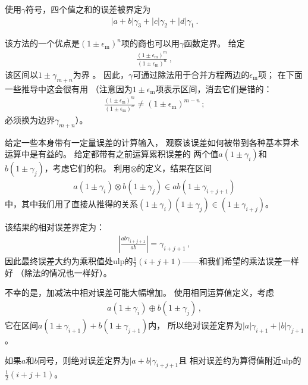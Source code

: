 使用$\gamma$符号，四个值之和的误差被界定为
\begin{align*}
    |a+b|\gamma_3+|c|\gamma_2+|d|\gamma_1\, .
\end{align*}

该方法的一个优点是$(1\pm\epsilon_{\mathrm{m}})^n$项的商也可以用$\gamma$函数定界。
给定
\begin{align*}
    \frac{(1\pm\epsilon_{\mathrm{m}})^m}{(1\pm\epsilon_{\mathrm{m}})^n}\, ,
\end{align*}
该区间以$1\pm\gamma_{m+n}$为界
。
因此，$\gamma$可通过除法用于合并方程两边的$\epsilon_{\mathrm{m}}$项；
在下面一些推导中这会很有用
（注意因为$1\pm\epsilon_{\mathrm{m}}$项表示区间，消去它们是错的：
\begin{align*}
    \frac{(1\pm\epsilon_{\mathrm{m}})^m}{(1\pm\epsilon_{\mathrm{m}})^n}\neq(1\pm\epsilon_{\mathrm{m}})^{m-n}\, ;
\end{align*}
必须换为边界$\gamma_{m+n}$）。

给定一些本身带有一定量误差的计算输入，
观察该误差如何被带到各种基本算术运算中是有益的。
给定都带有之前运算累积误差的
两个值$a(1\pm\gamma_i)$和$b(1\pm\gamma_j)$，考虑它们的积。
利用$\otimes$的定义，结果在区间
\begin{align*}
    a(1\pm\gamma_i)\otimes b(1\pm\gamma_j)\in ab(1\pm\gamma_{i+j+1})
\end{align*}
中，其中我们用了直接从推得的关系$(1\pm\gamma_i)(1\pm\gamma_j)\in(1\pm\gamma_{i+j})$。

该结果的相对误差界定为：
\begin{align*}
    \left|\frac{ab\gamma_{i+j+1}}{ab}\right|=\gamma_{i+j+1}\, ,
\end{align*}
因此最终误差大约为乘积值处ulp的$\displaystyle\frac{1}{2}(i+j+1)$——和我们希望的乘法误差一样好
（除法的情况也一样好）。

不幸的是，加减法中相对误差可能大幅增加。
使用相同运算值定义，考虑
\begin{align*}
    a(1\pm\gamma_i)\oplus b(1\pm\gamma_j)\, ,
\end{align*}
它在区间$a(1\pm\gamma_{i+1})+b(1\pm\gamma_{j+1})$内，
所以绝对误差定界为$|a|\gamma_{i+1}+|b|\gamma_{j+1}$。

如果$a$和$b$同号，则绝对误差定界为$|a+b|\gamma_{i+j+1}$且
相对误差约为算得值附近ulp的$\displaystyle\frac{1}{2}(i+j+1)$。

